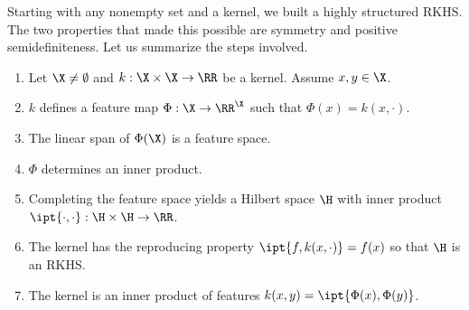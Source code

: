 Starting with any nonempty set and a kernel, we built a highly structured RKHS.
The two properties that made this possible are symmetry and positive semidefiniteness.
Let us summarize the steps involved.
\begin{enumerate}
    \item Let \(\X \neq \emptyset\) and \(k : \X \times \X \to \RR\) be a kernel.
    Assume \(x,y \in \X\).
    \item \(k\) defines a feature map \(\Phi : \X \to \RR^\X\) such that \(\Phi(x) = k(x, \cdot)\).
    \item The linear span of \(\Phi(\X)\) is a feature space.
    \item \(\Phi\) determines an inner product.
    \item Completing the feature space yields a Hilbert space \(\H\) with inner product \(\ipt{\cdot, \cdot} : \H \times \H \to \RR\).
    \item The kernel has the reproducing property \(\ipt{f, k(x,\cdot)} = f(x)\) so that \(\H\) is an RKHS.
    \item The kernel is an inner product of features \(k(x,y) = \ipt{\Phi(x),\Phi(y)}\).
\end{enumerate}
